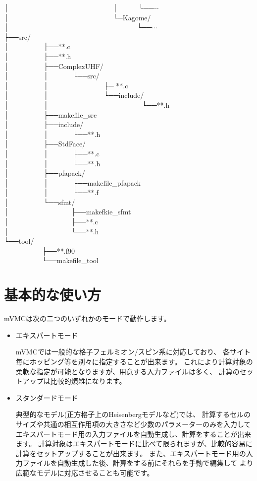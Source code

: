 │~~~~~~~~~~~~~~~~~~~~~~~~~~~~~~│~~~~~~└──$\cdots$\\
│~~~~~~~~~~~~~~~~~~~~~~~~~~~~~~└─Kagome/\\
│~~~~~~~~~~~~~~~~~~~~~~~~~~~~~~~~~~~~~└──$\cdots$\\
├──src/\\
│~~~~~~~~~~├──**.c\\
│~~~~~~~~~~├──**.h\\
│~~~~~~~~~~├──ComplexUHF/\\
│~~~~~~~~~~│~~~~~~~└──src/\\
│~~~~~~~~~~│~~~~~~~~~~~~~~~~├─ **.c\\
│~~~~~~~~~~│~~~~~~~~~~~~~~~~└──include/\\
│~~~~~~~~~~│~~~~~~~~~~~~~~~~~~~~~~~~~~~└──**.h\\
│~~~~~~~~~~├──makefile\_src\\
│~~~~~~~~~~├──include/\\
│~~~~~~~~~~│~~~~~~~└──**.h\\
│~~~~~~~~~~├──StdFace/\\
│~~~~~~~~~~│~~~~~~~├──**.c\\
│~~~~~~~~~~│~~~~~~~└──**.h\\
│~~~~~~~~~~├──pfapack/\\
│~~~~~~~~~~│~~~~~~~├──makefile\_pfapack\\
│~~~~~~~~~~│~~~~~~~└──**.f\\
│~~~~~~~~~~└──sfmt/\\
│~~~~~~~~~~~~~~~~~~├──makefkie\_sfmt\\
│~~~~~~~~~~~~~~~~~~├──**.c\\
│~~~~~~~~~~~~~~~~~~└──**.h\\
└──tool/\\
~~~~~~~~~~~├──**.f90\\
~~~~~~~~~~~└──makefile\_tool\\

\newpage
\section{基本的な使い方}

mVMCは次の二つのいずれかのモードで動作します。
\begin{itemize}
\item エキスパートモード

  mVMCでは一般的な格子フェルミオン/スピン系に対応しており、
  各サイト毎にホッピング等を別々に指定することが出来ます。
  これにより計算対象の柔軟な指定が可能となりますが、用意する入力ファイルは多く、
  計算のセットアップは比較的煩雑になります。
  
\item スタンダードモード

  典型的なモデル(正方格子上のHeisenbergモデルなど)では、
  計算するセルのサイズや共通の相互作用項の大きさなど少数のパラメーターのみを入力して
  エキスパートモード用の入力ファイルを自動生成し、計算をすることが出来ます。
  計算対象はエキスパートモードに比べて限られますが、比較的容易に計算をセットアップすることが出来ます。
  また、エキスパートモード用の入力ファイルを自動生成した後、計算をする前にそれらを手動で編集して
  より広範なモデルに対応させることも可能です。

\end{itemize}

